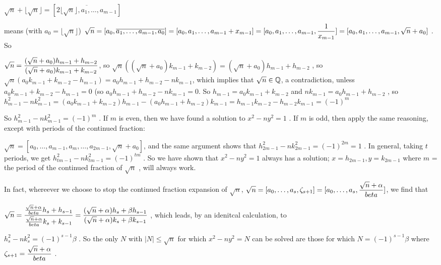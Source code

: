 $\sqrt{n}+\lfloor\sqrt{n}\rfloor = [\overline{2\lfloor\sqrt{n}\rfloor,a_1,\ldots,a_{m-1}}]$

means (with $a_0=\lfloor\sqrt{n}\rfloor$) 
$\displaystyle \sqrt{n}  = [a_0,\overline{a_1,\ldots,a_{m-1},a_0}] = 
[a_0,a_1,\ldots,a_{m-1}+x_{m-1}] = [a_0,a_1,\ldots,a_{m-1},{{1}\over{x_{m-1}}}]
= [a_0,a_1,\ldots,a_{m-1},\sqrt{n}+a_0]$  . So

$\displaystyle \sqrt{n} = {{(\sqrt{n}+a_0)h_{m-1} + h_{m-2}}\over{(\sqrt{n}+a_0)k_{m-1} + k_{m-2}}}$, 
so  $\sqrt{n}((\sqrt{n}+a_0)k_{m-1} + k_{m-2}) = (\sqrt{n}+a_0)h_{m-1} + h_{m-2}$ , so 
$\sqrt{n}(a_0k_{m-1} + k_{m-2} -h_{m-1}) = a_0h_{m-1}+h_{m-2}-nk_{m-1}$, which implies
that $\sqrt{n}\in{\Bbb Q}$, a contradiction, unless $a_0k_{m-1} + k_{m-2} -h_{m-1} = 0$ (so 
$a_0h_{m-1}+h_{m-2}-nk_{m-1} = 0$. 
So $h_{m-1} = a_0k_{m-1} + k_{m-2}$ and $nk_{m-1} = a_0h_{m-1}+h_{m-2}$ , so 
$h_{m-1}^2-nk_{m-1}^2 = (a_0k_{m-1} + k_{m-2})h_{m-1} - (a_0h_{m-1}+h_{m-2})k_{m-1}
= h_{m-1}k_{m-2} - h_{m-2}k_{m-1} = (-1)^m$

So $h_{m-1}^2-nk_{m-1}^2 = (-1)^m$ . If $m$ is even, then we have found a solution to
$x^2-ny^2=1$ . If $m$ is odd, then apply the same reasoning, except with 
periods of the continued fraction: 

$\sqrt{n} = [a_0,\ldots,a_{m-1},a_m,\ldots,a_{2m-1},\sqrt{n}+a_0]$, and the same argument shows
that $h_{2m-1}^2-nk_{2m-1}^2 = (-1)^{2m} = 1$ . In general, taking $t$ periods, we get
$h_{tm-1}^2-nk_{tm-1}^2 = (-1)^{tm}$ . So we have shown that $x^2-ny^2=1$ always has a solution;
$x=h_{2m-1}, y=k_{2m-1}$ where $m$ = the period of the continued fraction of $\sqrt{n}$ , will
always work.

\ssk

In fact, whereever we choose to stop the continued fraction expansion of $\sqrt{n}$, 
$\displaystyle \sqrt{n} = [a_0,\ldots,a_s,\zeta_{s+1}] = [a_0,\ldots,a_s,{{\sqrt{n}+\alpha}\over{beta}}]$, we
find that 

$\displaystyle \sqrt{n} = 
{{{{\sqrt{n}+\alpha}\over{beta}}h_s+h_{s-1}}\over{{{\sqrt{n}+\alpha}\over{beta}}k_s+k_{s-1}}}
= {{(\sqrt{n}+\alpha)h_s+\beta h_{s-1}}\over{(\sqrt{n}+\alpha)k_s+\beta k_{s-1}}}$ , which 
leads, by an idenitcal calculation, to 

$h_s^2-nk_s^2 = (-1)^{s-1}\beta$ . So the only $N$ with $|N|\leq \sqrt{n}$ for which $x^2-ny^2=N$
can be solved are those for which $N = (-1)^{s-1}\beta$ where 
$\displaystyle \zeta_{s+1} = {{\sqrt{n}+\alpha}\over{beta}}$ . 

\msk

